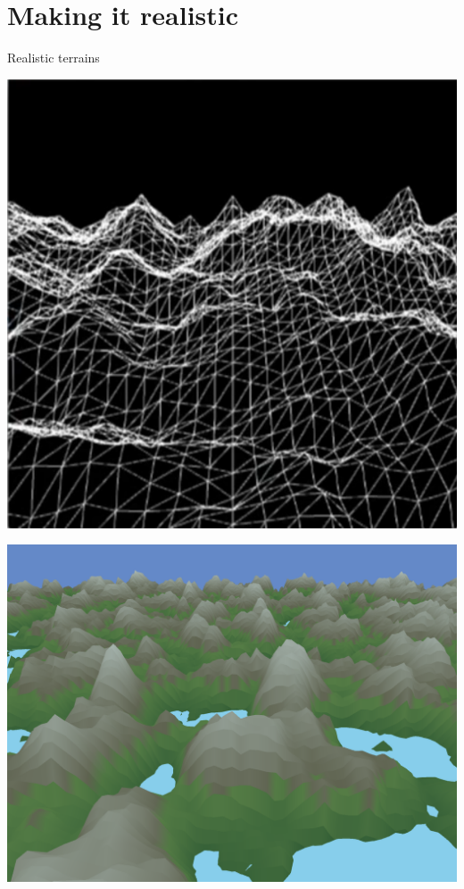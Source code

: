 \section{Making it realistic}
\begin{frame}{Realistic terrains}
    \begin{minipage}{0.45\textwidth}
        \centering
        \includegraphics[width=\linewidth]{images/temp.png}
    \end{minipage}%
    \hfill
    \pause
    \begin{minipage}{0.45\textwidth}
        \centering
        \includegraphics[width=\linewidth]{images/terrain.png}
    \end{minipage}


\end{frame}
